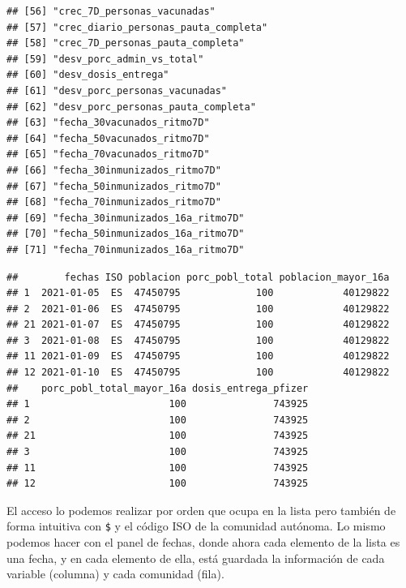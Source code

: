 \documentclass[11pt,]{book}
\newenvironment{Shaded}{\begin{snugshade}}{\end{snugshade}}
\newcommand{\DecValTok}[1]{\textcolor[rgb]{0.06,0.06,0.06}{#1}}
\newcommand{\KeywordTok}[1]{\textcolor[rgb]{0.27,0.27,0.27}{\textbf{#1}}}
\newcommand{\NormalTok}[1]{#1}
\newcommand{\OperatorTok}[1]{\textcolor[rgb]{0.43,0.43,0.43}{\textbf{#1}}}
\begin{document}
\begin{verbatim}
## [56] "crec_7D_personas_vacunadas"          
## [57] "crec_diario_personas_pauta_completa" 
## [58] "crec_7D_personas_pauta_completa"     
## [59] "desv_porc_admin_vs_total"            
## [60] "desv_dosis_entrega"                  
## [61] "desv_porc_personas_vacunadas"        
## [62] "desv_porc_personas_pauta_completa"   
## [63] "fecha_30vacunados_ritmo7D"           
## [64] "fecha_50vacunados_ritmo7D"           
## [65] "fecha_70vacunados_ritmo7D"           
## [66] "fecha_30inmunizados_ritmo7D"         
## [67] "fecha_50inmunizados_ritmo7D"         
## [68] "fecha_70inmunizados_ritmo7D"         
## [69] "fecha_30inmunizados_16a_ritmo7D"     
## [70] "fecha_50inmunizados_16a_ritmo7D"     
## [71] "fecha_70inmunizados_16a_ritmo7D"
\end{verbatim}

\begin{Shaded}
\end{Shaded}

\begin{verbatim}
##        fechas ISO poblacion porc_pobl_total poblacion_mayor_16a
## 1  2021-01-05  ES  47450795             100            40129822
## 2  2021-01-06  ES  47450795             100            40129822
## 21 2021-01-07  ES  47450795             100            40129822
## 3  2021-01-08  ES  47450795             100            40129822
## 11 2021-01-09  ES  47450795             100            40129822
## 12 2021-01-10  ES  47450795             100            40129822
##    porc_pobl_total_mayor_16a dosis_entrega_pfizer
## 1                        100               743925
## 2                        100               743925
## 21                       100               743925
## 3                        100               743925
## 11                       100               743925
## 12                       100               743925
\end{verbatim}

El acceso lo podemos realizar por orden que ocupa en la lista pero también de forma intuitiva con \texttt{\$} y el código ISO de la comunidad autónoma. Lo mismo podemos hacer con el panel de fechas, donde ahora cada elemento de la lista es una fecha, y en cada elemento de ella, está guardada la información de cada variable (columna) y cada comunidad (fila).
\end{document}
